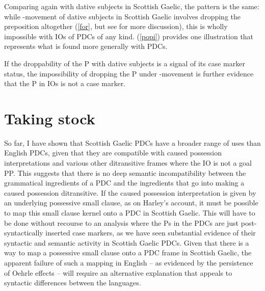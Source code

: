 \documentclass[output=paper,colorlinks,citecolor=brown]{langscibook}
\begin{document}
Comparing again with dative subjects in Scottish Gaelic, the pattern is the same: while -movement of dative subjects in Scottish Gaelic involves dropping the preposition altogether (\ref{for}, but see \cite{gt:Thoms:2024p} for more discussion), this is wholly impossible with IOs of PDCs of any kind. (\ref{popi}) provides one illustration that represents what is found more generally with PDCs. 



\noindent If the droppability of the P with dative subjects is a signal of its case marker status, the impossibility of dropping the P under -movement is further evidence that the P in IOs is not a case marker. 
\is{pied-piping with inversion|)}

\section{Taking stock}

So far, I have shown that Scottish Gaelic PDCs have a broader range of uses than English PDCs, given that they are compatible with caused possession interpretations and various other ditransitive frames where the IO is not a goal PP. This suggests that there is no deep semantic incompatibility between the grammatical ingredients of a PDC and the ingredients that go into making a caused possession ditransitive. If the caused possession interpretation is given by an underlying possessive small clause, as on Harley's account, it must be possible to map this small clause kernel onto a PDC in Scottish Gaelic. This will have to be done without recourse to an analysis where the Ps in the PDCs are just post-syntactically inserted case markers, as we have seen substantial evidence of their syntactic and semantic activity in Scottish Gaelic PDCs. Given that there is a way to map a possessive small clause onto a PDC frame in Scottish Gaelic, the apparent failure of such a mapping in English -- as evidenced by the persistence of Oehrle effects --  will require an alternative explanation that appeals to syntactic differences between the languages.  
\end{document}
